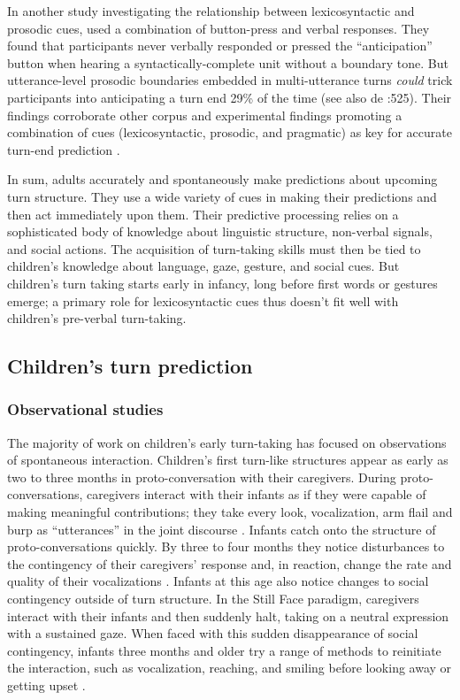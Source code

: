 \documentclass[authoryear, 12pt]{elsarticle}
\begin{document}
In another study investigating the relationship between lexicosyntactic and prosodic cues, \citet*{bogelsUndRev} used a combination of button-press and verbal responses.
They found that participants never verbally responded or pressed the ``anticipation'' button when hearing a syntactically-complete unit without a boundary tone. But utterance-level prosodic boundaries embedded in multi-utterance turns \textit{could} trick participants into anticipating a turn end 29\% of the time (see also de \citet{de-ruiter2006}:525). Their findings corroborate other corpus and experimental findings promoting a combination of cues (lexicosyntactic, prosodic, and pragmatic) as key for accurate turn-end prediction \citep{duncan1972, ford1996, hirvenkari2013}.

In sum, adults accurately and spontaneously make predictions about upcoming turn structure. They use a wide variety of cues in making their predictions and then act immediately upon them. Their predictive processing relies on a sophisticated body of knowledge about linguistic structure, non-verbal signals, and social actions. The acquisition of turn-taking skills must then be tied to children's knowledge about language, gaze, gesture, and social cues. But children's turn taking starts early in infancy, long before first words or gestures emerge; a primary role for lexicosyntactic cues thus doesn't fit well with children's pre-verbal turn-taking. 

\subsection{Children's turn prediction}

\subsubsection{Observational studies}

The majority of work on children's early turn-taking has focused on observations of spontaneous interaction. Children's first turn-like structures appear as early as two to three months in proto-conversation with their caregivers. During proto-conversations, caregivers interact with their infants as if they were capable of making meaningful contributions; they take every look, vocalization, arm flail and burp as ``utterances'' in the joint discourse \citep{snow1977, jaffe2001}. Infants catch onto the structure of proto-conversations quickly. By three to four months they notice disturbances to the contingency of their caregivers' response and, in reaction, change the rate and quality of their vocalizations \citep{k-bloom1988, masataka1993}. Infants at this age also notice changes to social contingency outside of turn structure. In the Still Face paradigm, caregivers interact with their infants and then suddenly halt, taking on a neutral expression with a sustained gaze. When faced with this sudden disappearance of social contingency, infants three months and older try a range of methods to reinitiate the interaction, such as vocalization, reaching, and smiling before looking away or getting upset \citep{rochat1998, toda1993}.
\end{document}
